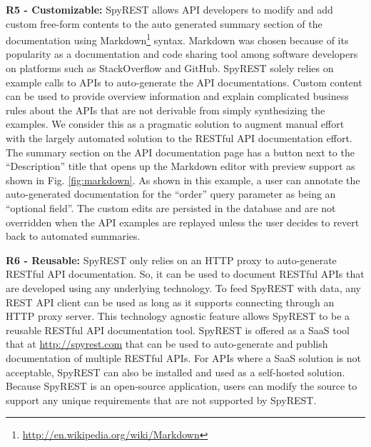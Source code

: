\documentclass[conference]{IEEEtran}
\begin{document}
\textbf{R5 - Customizable:} SpyREST allows API developers to modify and add custom free-form contents to the auto generated summary section of the documentation using Markdown\footnote{\url{http://en.wikipedia.org/wiki/Markdown}} syntax. Markdown was chosen because of its popularity as a documentation and code sharing tool among software developers on platforms such as StackOverflow and GitHub. SpyREST solely relies on example calls to APIs to auto-generate the API documentations. Custom content can be used to provide overview information and explain complicated business rules about the APIs that are not derivable from simply synthesizing the examples. We consider this as a pragmatic solution to augment manual effort with the largely automated solution to the RESTful API documentation effort. The summary section on the API documentation page has a button next to the ``Description'' title that opens up the Markdown editor with preview support as shown in Fig. \ref{fig:markdown}. As shown in this example, a user can annotate the auto-generated documentation for the ``order'' query parameter as being an ``optional field''. The custom edits are persisted in the database and are not overridden when the API examples are replayed unless the user decides to revert back to automated summaries.

\textbf{R6 - Reusable:} SpyREST only relies on an HTTP proxy to auto-generate RESTful API documentation. So, it can be used to document RESTful APIs that are developed using any underlying technology. To feed SpyREST with data, any REST API client can be used as long as it supports connecting through an HTTP proxy server. This technology agnostic feature allows SpyREST to be a reusable RESTful API documentation tool. SpyREST is offered as a SaaS tool that at \url{http://spyrest.com} that can be used to auto-generate and publish documentation of multiple RESTful APIs. For APIs where a SaaS solution is not acceptable, SpyREST can also be installed and used as a self-hosted solution. Because SpyREST is an open-source application, users can modify the source to support any unique requirements that are not supported by SpyREST.
\end{document}
